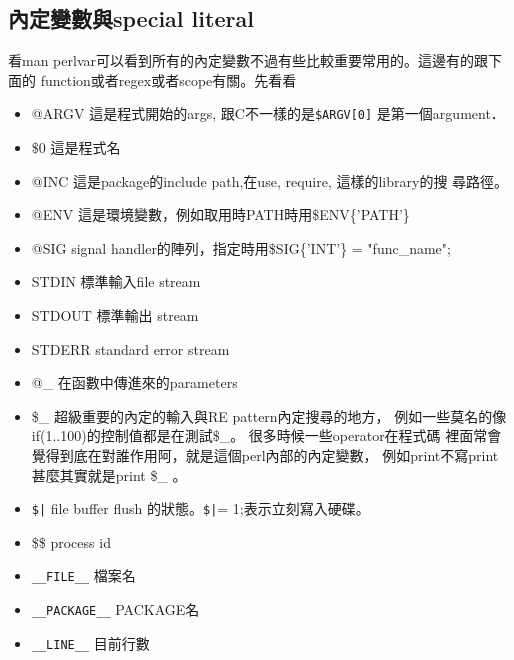     \subsection{內定變數與special literal}
    看man perlvar可以看到所有的內定變數不過有些比較重要常用的。這邊有的跟下面的
    function或者regex或者scope有關。先看看
    \begin{itemize}
    \item @ARGV 這是程式開始的args, 跟C不一樣的是\verb=$ARGV[0]=
	  是第一個argument．
    \item \$0	這是程式名
	    
    \item @INC	這是package的include path,在use, require, 這樣的library的搜
		尋路徑。
    \item @ENV	這是環境變數，例如取用時PATH時用\$ENV\{'PATH'\}
    \item @SIG	signal handler的陣列，指定時用\$SIG\{'INT'\} = "func\_name";
    \item STDIN	 標準輸入file stream
    \item STDOUT 標準輸出 stream
    \item STDERR standard error stream

    \item @\_	在函數中傳進來的parameters
    \item \$\_  超級重要的內定的輸入與RE pattern內定搜尋的地方，
	    例如一些莫名的像if(1..100)的控制值都是在測試\$\_。
	    很多時候一些operator在程式碼
	    裡面常會覺得到底在對誰作用阿，就是這個perl內部的內定變數，
	    例如print不寫print甚麼其實就是print \$\_ 。

    \item \verb=$|=  file buffer flush 的狀態。\verb=$|== 1;表示立刻寫入硬碟。
    \item \$\$	process id

    \item \verb=__FILE__=	    檔案名
    \item \verb=__PACKAGE__=	    PACKAGE名
    \item \verb=__LINE__=	    目前行數
    \end{itemize}

